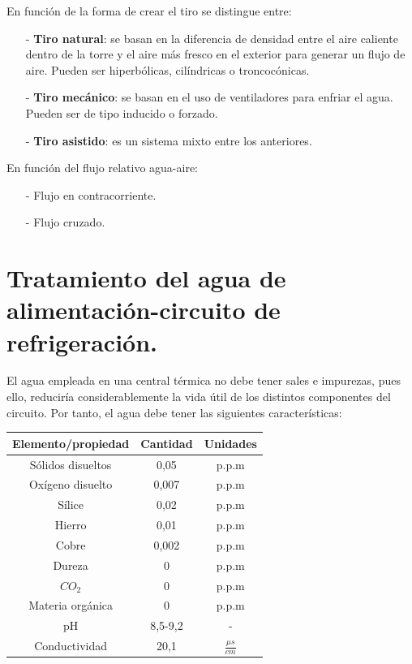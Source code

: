 En función de la forma de crear el tiro se distingue entre:
\begin{itemize}
	\item [-] \textbf{Tiro natural}: se basan en la diferencia de densidad entre el aire caliente dentro de la torre y el aire más fresco en el exterior para generar un flujo de aire. Pueden ser hiperbólicas, cilíndricas o troncocónicas.
	\item [-] \textbf{Tiro mecánico}: se basan en el uso de ventiladores para enfriar el agua. Pueden ser de tipo inducido o forzado.
	\item [-] \textbf{Tiro asistido}: es un sistema mixto entre los anteriores.
\end{itemize}

En función del flujo relativo agua-aire:
\begin{itemize}
	\item [-] Flujo en contracorriente.
	\item [-] Flujo cruzado.
\end{itemize}
\section{Tratamiento del agua de alimentación-circuito de refrigeración.}
El agua empleada en una central térmica no debe tener sales e impurezas, pues ello, reduciría considerablemente la vida útil de los distintos componentes del circuito. Por tanto, el agua debe tener las siguientes características:
\begin{table}[H]
	\centering
	\renewcommand{\arraystretch}{1.5}
	\begin{tabular}{ccc}
		\hline
		Elemento/propiedad&Cantidad &Unidades\\
		\hline
		Sólidos disueltos&0,05 &p.p.m\\
		\hline
		Oxígeno disuelto&0,007  &p.p.m\\
		\hline
		Sílice&0,02 &p.p.m\\
		\hline
		Hierro&0,01&p.p.m\\
		\hline
		Cobre& 0,002&p.p.m\\
		\hline
		Dureza&0 &p.p.m\\
		\hline
		$CO_2$&0 &p.p.m\\
		\hline
		Materia orgánica& 0&p.p.m\\
		\hline
		pH&8,5-9,2 & -\\
		\hline
		Conductividad& 20,1&$\frac{\mu s}{cm}$\\
		\hline
	\end{tabular}
\end{table}

